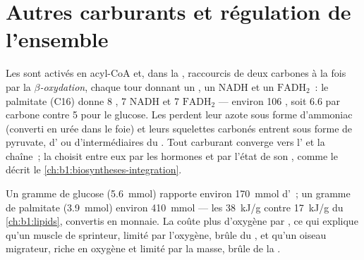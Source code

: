 \section{Autres carburants et régulation de l'ensemble}

\begin{proposition}\label{prop:b1:respiration-fermentation:otherfuels}
Les  sont activés en acyl-CoA et, dans la , raccourcis de deux carbones à la fois par la
\emph{$\beta$-oxydation}, chaque tour donnant un , un NADH et
un $\mathrm{FADH_2}$~: le palmitate (C16) donne 8 , 7 NADH et
7 $\mathrm{FADH_2}$ --- environ 106 , soit \qty{6.6}{}  par
carbone contre 5 pour le glucose. Les  perdent leur azote
sous forme d'ammoniac (converti en urée dans le foie) et leurs
squelettes carbonés entrent sous forme de pyruvate, d' ou
d'intermédiaires du . Tout carburant converge vers
l' et la chaîne~; la  choisit entre eux par les
hormones et par l'état de son , comme le décrit le
\cref{ch:b1:biosyntheses-integration}.
\end{proposition}

\begin{example}\label{ex:b1:respiration-fermentation:gramofeach}
Un gramme de glucose (\qty{5.6}{mmol}) rapporte environ \qty{170}{mmol}
d'~; un gramme de palmitate (\qty{3.9}{mmol}) environ
\qty{410}{mmol} --- les \qty{38}{kJ/g} contre \qty{17}{kJ/g} du
\cref{ch:b1:lipids}, convertis en monnaie. La  coûte plus
d'oxygène par , ce qui explique qu'un muscle de sprinteur, limité par
l'oxygène, brûle du , et qu'un oiseau migrateur, riche en
oxygène et limité par la masse, brûle de la .
\end{example}

